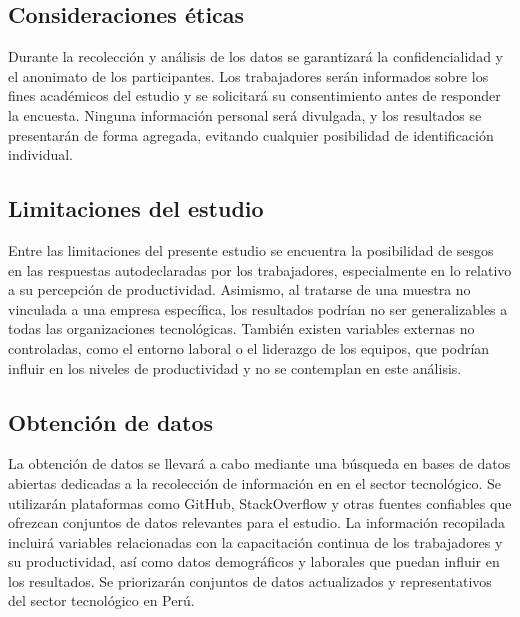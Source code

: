 	\subsection{Consideraciones éticas}
	
	Durante la recolección y análisis de los datos se garantizará la confidencialidad y el anonimato de los participantes. Los trabajadores serán informados sobre los fines académicos del estudio y se solicitará su consentimiento antes de responder la encuesta. Ninguna información personal será divulgada, y los resultados se presentarán de forma agregada, evitando cualquier posibilidad de identificación individual.
	
	\subsection{Limitaciones del estudio}
	
	Entre las limitaciones del presente estudio se encuentra la posibilidad de sesgos en las respuestas autodeclaradas por los trabajadores, especialmente en lo relativo a su percepción de productividad. Asimismo, al tratarse de una muestra no vinculada a una empresa específica, los resultados podrían no ser generalizables a todas las organizaciones tecnológicas. También existen variables externas no controladas, como el entorno laboral o el liderazgo de los equipos, que podrían influir en los niveles de productividad y no se contemplan en este análisis.

	\subsection{Obtención de datos}

	La obtención de datos se llevará a cabo mediante una búsqueda en bases de datos abiertas dedicadas a la recolección de información en en el sector tecnológico. Se utilizarán plataformas como GitHub, StackOverflow y otras fuentes confiables que ofrezcan conjuntos de datos relevantes para el estudio. La información recopilada incluirá variables relacionadas con la capacitación continua de los trabajadores y su productividad, así como datos demográficos y laborales que puedan influir en los resultados. Se priorizarán conjuntos de datos actualizados y representativos del sector tecnológico en Perú.